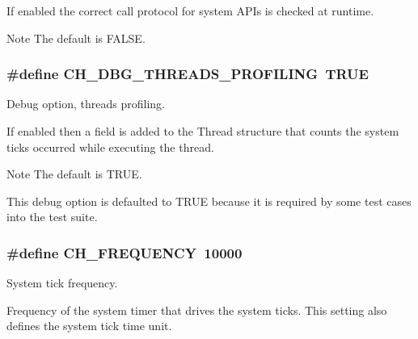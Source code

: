 If enabled the correct call protocol for system A\+P\+Is is checked at runtime.

\begin{DoxyNote}{Note}
The default is {\ttfamily F\+A\+L\+S\+E}. 
\end{DoxyNote}
\hypertarget{group__config_gadc9c00c2e5b6e766ded8dfa77c0c90c1}{}
\subsubsection[{C\+H\+\_\+\+D\+B\+G\+\_\+\+T\+H\+R\+E\+A\+D\+S\+\_\+\+P\+R\+O\+F\+I\+L\+I\+N\+G}]{\setlength{\rightskip}{0pt plus 5cm}\#define C\+H\+\_\+\+D\+B\+G\+\_\+\+T\+H\+R\+E\+A\+D\+S\+\_\+\+P\+R\+O\+F\+I\+L\+I\+N\+G~T\+R\+U\+E}\label{group__config_gadc9c00c2e5b6e766ded8dfa77c0c90c1}


Debug option, threads profiling. 

If enabled then a field is added to the {\ttfamily Thread} structure that counts the system ticks occurred while executing the thread.

\begin{DoxyNote}{Note}
The default is {\ttfamily T\+R\+U\+E}. 

This debug option is defaulted to T\+R\+U\+E because it is required by some test cases into the test suite. 
\end{DoxyNote}
\hypertarget{group__config_ga195ab8ff3340a18d4513cbaf915078f2}{}
\subsubsection[{C\+H\+\_\+\+F\+R\+E\+Q\+U\+E\+N\+C\+Y}]{\setlength{\rightskip}{0pt plus 5cm}\#define C\+H\+\_\+\+F\+R\+E\+Q\+U\+E\+N\+C\+Y~10000}\label{group__config_ga195ab8ff3340a18d4513cbaf915078f2}


System tick frequency. 

Frequency of the system timer that drives the system ticks. This setting also defines the system tick time unit. \hypertarget{group__config_gac73902e3c40b375483f9dde71e83253d}{}
